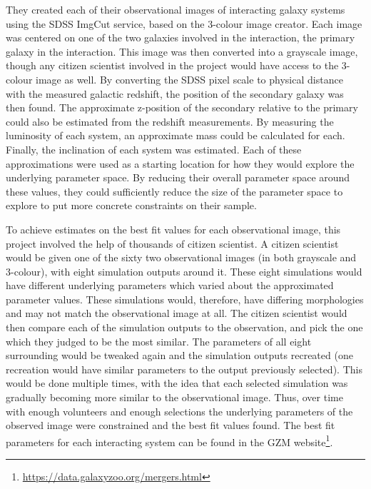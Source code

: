 They created each of their observational images of interacting galaxy systems using the SDSS ImgCut service, based on the \citet{2004PASP..116..133L} 3-colour image creator. Each image was centered on one of the two galaxies involved in the interaction, the primary galaxy in the interaction. This image was then converted into a grayscale image, though any citizen scientist involved in the project would have access to the 3-colour image as well. By converting the SDSS pixel scale to physical distance with the measured galactic redshift, the position of the secondary galaxy was then found. The approximate z-position of the secondary relative to the primary could also be estimated from the redshift measurements. By measuring the luminosity of each system, an approximate mass could be calculated for each. Finally, the inclination of each system was estimated. Each of these approximations were used as a starting location for how they would explore the underlying parameter space. By reducing their overall parameter space around these values, they could sufficiently reduce the size of the parameter space to explore to put more concrete constraints on their sample. 

To achieve estimates on the best fit values for each observational image, this project involved the help of thousands of citizen scientist. A citizen scientist would be given one of the sixty two observational images (in both grayscale and 3-colour), with eight simulation outputs around it. These eight simulations would have different underlying parameters which varied about the approximated parameter values. These simulations would, therefore, have differing morphologies and may not match the observational image at all. The citizen scientist would then compare each of the simulation outputs to the observation, and pick the one which they judged to be the most similar. The parameters of all eight surrounding would be tweaked again and the simulation outputs recreated (one recreation would have similar parameters to the output previously selected). This would be done multiple times, with the idea that each selected simulation was gradually becoming more similar to the observational image. Thus, over time with enough volunteers and enough selections the underlying parameters of the observed image were constrained and the best fit values found. The best fit parameters for each interacting system can be found in the GZM website\footnote{\url{https://data.galaxyzoo.org/mergers.html}}.

